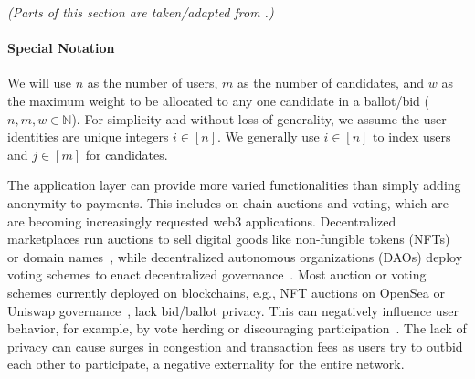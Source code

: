 \textit{(Parts of this section are taken/adapted from \cite{EPRINT:GSZB23}.)}

\paragraph{Special Notation} We will use $n$ as the number of users, $m$ as the number of candidates, and $w$ as the maximum weight to be allocated to any one candidate in a ballot/bid ($n,m,w \in \mathbb{N}$). For simplicity and without loss of generality, we assume the user identities are unique integers $i \in [n]$.
We generally use $i \in [n]$ to index users and $j \in [m]$ for candidates.

The application layer can provide more varied functionalities than simply adding anonymity to payments. This includes on-chain auctions and voting, which are are becoming increasingly requested web3 applications.
Decentralized marketplaces run auctions to sell digital goods like non-fungible tokens (NFTs)~\cite{opensea_auction} or domain names~\cite{ARXIV:XWYLLX21}, while decentralized autonomous organizations (DAOs) deploy voting schemes to enact decentralized governance~\cite{optimismgov}. 
Most auction or voting schemes currently deployed on blockchains, e.g., NFT auctions on OpenSea or Uniswap governance~\cite{ARXIV:FMW22}, lack bid/ballot privacy. This can negatively influence user behavior, for example, by vote herding or discouraging participation~\cite{FC:ElkLip04,WTSC:GalYou18,FC:SuzYok03}. The lack of privacy can cause surges in congestion and transaction fees as users try to outbid each other to participate, a negative externality for the entire network.
    
